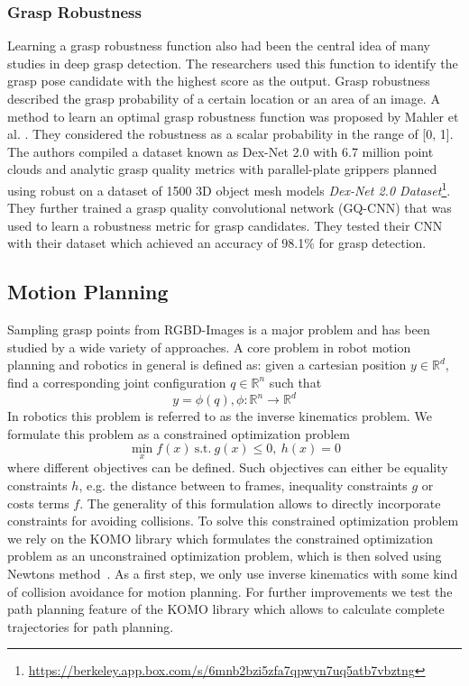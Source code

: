\documentclass[a4paper]{article}
\begin{document}
\subsubsection{Grasp Robustness}
Learning a grasp robustness function also had been the central idea of many studies in deep grasp detection. 
The researchers used this function to identify the grasp pose candidate with the highest score as the output. 
Grasp robustness described the grasp probability of a certain location or an area of an image.
A method to learn an optimal grasp robustness function was proposed by Mahler et al. \cite{27_mahler2017dex}.
They considered the robustness as a scalar probability in the range of [0, 1]. 
The authors compiled a dataset known as Dex-Net 2.0 with 6.7 million point clouds and analytic grasp quality metrics with
parallel-plate grippers planned using robust on a dataset of 1500 3D object mesh models \textit{Dex-Net 2.0 Dataset}\footnote{\url{https://berkeley.app.box.com/s/6mnb2bzi5zfa7qpwyn7uq5atb7vbztng}}. 
They further trained a grasp quality convolutional network (GQ-CNN) that was used to learn a robustness metric for grasp candidates. They tested their CNN with their dataset which achieved an accuracy of 98.1\% for grasp detection.



\subsection{Motion Planning}
\label{3_2subsec_motion_planning}
Sampling grasp points from RGBD-Images is a major problem and has been studied by a wide variety of approaches.
A core problem in robot motion planning and robotics in general is defined as: given a cartesian position $y \in \mathbb{R}^d$, find a corresponding joint configuration $q \in \mathbb{R}^n$ such that
\begin{equation}
    y = \phi(q),  \phi : \mathbb{R}^n \rightarrow \mathbb{R}^d
\end{equation}
In robotics this problem is referred to as the inverse kinematics problem.
We formulate this problem as a constrained optimization problem 
\begin{equation}
    \min_x f(x) \ \text{s.t.} \ g(x) \leq 0, \  h(x) = 0
\end{equation}
where different objectives can be defined. 
Such objectives can either be equality constraints $h$, e.g. the distance between to frames, inequality constraints $g$ or costs terms $f$.
The generality of this formulation allows to directly incorporate constraints for avoiding collisions.
To solve this constrained optimization problem we rely on the KOMO library which formulates the constrained optimization problem as an unconstrained optimization problem, which is then solved using Newtons method~\cite{laumond_tutorial_2017}.
As a first step, we only use inverse kinematics with some kind of collision avoidance for motion planning. 
For further improvements we test the path planning feature of the KOMO library which allows to calculate complete trajectories for path planning.
\end{document}
